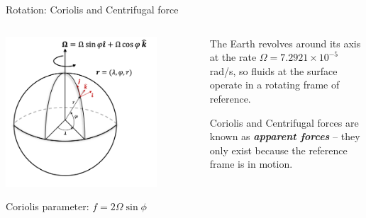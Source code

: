 \documentclass[aspectratio=169,xcolor=dvipsnames]{beamer}
\begin{document}
{

\begin{frame}{Rotation: Coriolis and Centrifugal force}
\begin{columns}
    \begin{column}{0.5\textwidth}
        \begin{center}
        \includegraphics[width=0.8\textwidth]{figs/Fig-SphericalCoordRotating.png}
        \end{center}

        \vspace{-1em}

        \begin{minipage}{0.7\textwidth}
        \begin{block}{}
        \small
        Coriolis parameter: $f = 2\Omega \sin\phi$
        \end{block}
        \end{minipage}
        
    \end{column}
    \begin{column}{0.5\textwidth}
        The Earth revolves around its axis at the rate $\Omega = 7.2921\times10^{-5}$\,rad/s, so fluids at the surface operate in a rotating frame of reference.
        
        \vspace{1.2em}
        
        Coriolis and Centrifugal forces are known as \textbf{\emph{apparent forces}} --
        they only exist because the
        reference frame is in motion.
        

\end{column}
\end{columns}
\end{frame}}
\end{document}

